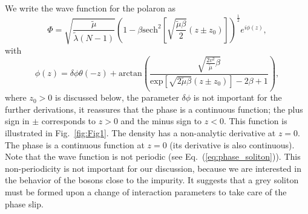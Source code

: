 \documentclass[twocolumn,amsmath,amssymb,showpacs,prl,superscriptaddress,aps]{revtex4-1}
\begin{document}

We write the wave function for the polaron as
\begin{equation}
\Phi=\sqrt{\frac{\tilde \mu}{\tilde \lambda (N-1)}}\left(1-\beta \mathrm{sech}^2\left[\sqrt{\frac{\tilde\mu\beta}{2}}(z\pm z_0)\right]\right)^{\frac{1}{2}}e^{i\phi(z)},
\end{equation}
with 
\begin{equation}
\phi(z)=\delta \phi \theta(-z)+\mathrm{arctan}\left(\frac{\sqrt{\frac{2 v^2}{\tilde \mu}\beta}}{\mathrm{exp}\left[\sqrt{2\tilde \mu\beta}(z\pm z_0)\right]-2\beta+1}\right),
\label{eq:phase_soliton}
\end{equation}
where $z_0>0$ is discussed below, the parameter $\delta \phi$ is not important for the further derivations, it reassures that the phase is a continuous function;
the plus sign in $\pm$ corresponds to $z>0$ and the minus sign to $z<0$. This function is illustrated in Fig.~\ref{fig:Fig1}. 
The density has a non-analytic derivative at $z=0$. The phase is a continuous function at $z=0$ (its derivative is also continuous).
Note that the wave function is not periodic (see Eq.~(\ref{eq:phase_soliton})). This non-periodicity is not important 
for our discussion, because we are interested in the behavior of the bosons close to the impurity. It suggests that a grey soliton
must be formed upon a change of interaction parameters to take care of the phase slip.
\end{document}
